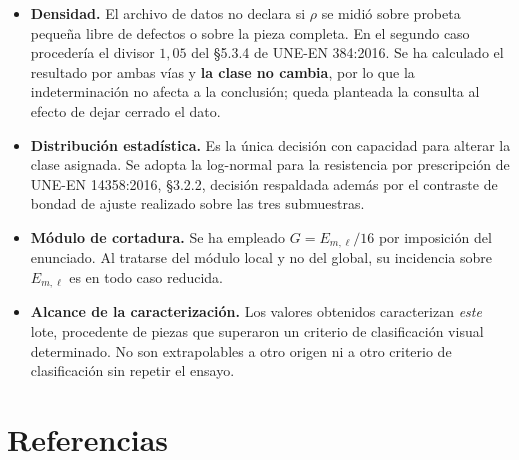 \documentclass[11pt,a4paper]{article}
\newcommand{\Eml}{E_{m,\ell}}
\begin{document}
\begin{itemize}
  \item \textbf{Densidad.} El archivo de datos no declara si $\rho$ se midió sobre
        probeta pequeña libre de defectos o sobre la pieza completa. En el segundo caso
        procedería el divisor $1{,}05$ del \S5.3.4 de UNE-EN 384:2016. Se ha calculado
        el resultado por ambas vías y \textbf{la clase no cambia}, por lo que la
        indeterminación no afecta a la conclusión; queda planteada la consulta al
        efecto de dejar cerrado el dato.
  \item \textbf{Distribución estadística.} Es la única decisión con capacidad para
        alterar la clase asignada. Se adopta la log-normal para la resistencia por
        prescripción de UNE-EN 14358:2016, \S3.2.2, decisión respaldada además por el
        contraste de bondad de ajuste realizado sobre las tres submuestras.
  \item \textbf{Módulo de cortadura.} Se ha empleado $G = \Eml/16$ por imposición del
        enunciado. Al tratarse del módulo local y no del global, su incidencia sobre
        $\Eml$ es en todo caso reducida.
  \item \textbf{Alcance de la caracterización.} Los valores obtenidos caracterizan
        \emph{este} lote, procedente de piezas que superaron un criterio de
        clasificación visual determinado. No son extrapolables a otro origen ni a otro
        criterio de clasificación sin repetir el ensayo.
\end{itemize}

\section*{Referencias}
\end{document}

